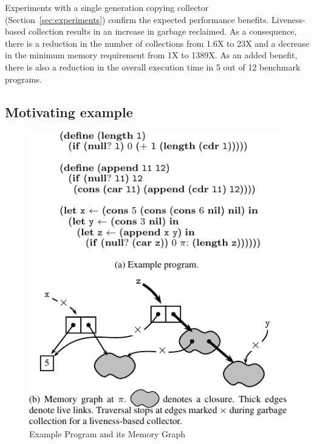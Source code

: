 \documentclass[9pt,preprint,nonatbib]{sigplanconf}
\begin{document}
Experiments    with   a    single    generation   copying    collector
(Section~\ref{sec:experiments})   confirm  the   expected  performance
benefits.  Liveness-based collection results in an increase in garbage
reclaimed.  As  a consequence, there is  a reduction in the  number of
collections from 1.6X  to 23X and a decrease  in the minimum
memory requirement from  1X to 1389X.  As  an added benefit,
there is also a reduction in the overall execution time in 5 out of 12
benchmark programs.
 

\subsection{Motivating example}
\label{sec:motiv}

\begin{figure}[t!]
  \includegraphics[width=\columnwidth]{fig_motiv.pdf}
  \caption{Example Program and its Memory Graph}\label{fig:mot-example}
\end{figure}
\end{document}

